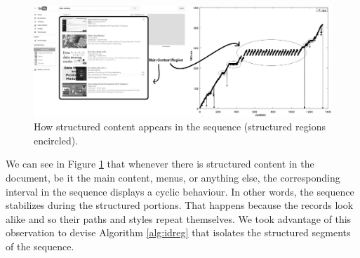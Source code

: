 \documentclass{vldb}
\begin{document}
\begin{figure}[h]
  \centering
     \includegraphics[width=\textwidth]{img/main-reg.jpg}
  \caption{How structured content appears in the sequence (structured regions encircled).}
  \label{fig:stru}
\end{figure}

We can see in Figure \ref{fig:stru} that whenever there is structured content in
the document, be it the main content, menus, or anything else, the corresponding
interval in the sequence displays a cyclic behaviour. In other words, the
sequence stabilizes during the structured portions. That happens because the
records look alike and so their paths and styles repeat themselves. We took
advantage of this observation to devise Algorithm \ref{alg:idreg} that isolates
the structured segments of the sequence.
\end{document}
